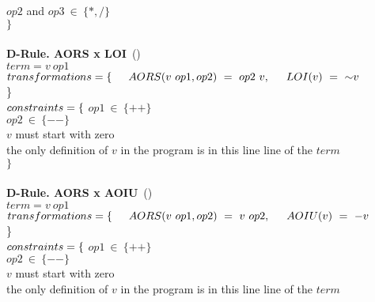 \indent $op2$ and $op3~\in~\{*, /\}  $\\ 
$\}$
\\
\\
\textbf{D-Rule. AORS x LOI}~(\mujava{})\\
$term = v~op1 $\\
$transformations = \{\\ \indent AORS(v~op1, op2)~=~op2~v,\\ \indent LOI(v)~=~{\sim}v$\\\}\\
$constraints = \{ \\$ 
\indent $op1~\in~\{++\}  $\\ 
\indent $op2~\in~\{--\}  $\\ 
\indent $v$ must start with zero \\ 
\indent the only definition of $v$ in the program is in this line line of the $term$\\ 
$\}$
\\
\\
\textbf{D-Rule. AORS x AOIU}~(\mujava{})\\
$term = v~op1 $\\
$transformations = \{\\ \indent AORS(v~op1, op2)~=~v~op2,\\ \indent AOIU(v)~=~-v$\\\}\\
$constraints = \{ \\$ 
\indent $op1~\in~\{++\}  $\\ 
\indent $op2~\in~\{--\}  $\\ 
\indent $v$ must start with zero \\ 
\indent the only definition of $v$ in the program is in this line line of the $term$\\ 
